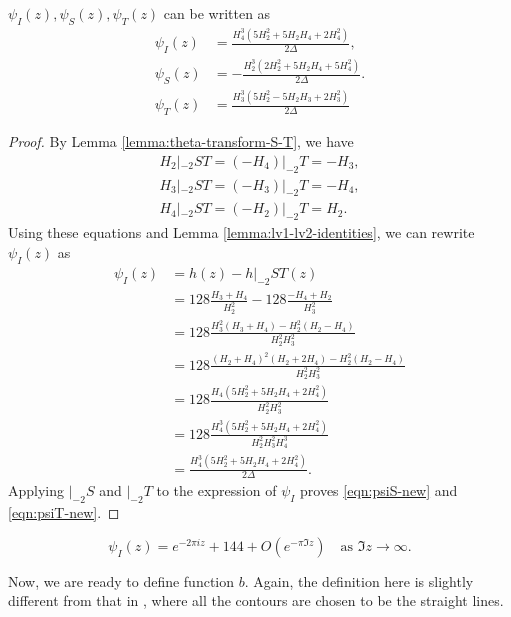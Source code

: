 \begin{lemma}\label{lemma:psi-new}\leanok
    $\psi_I(z), \psi_S(z), \psi_T(z)$ can be written as
    \begin{align}
        \psi_I(z) &= \frac{H_4^3 (5 H_2^2 + 5 H_2 H_4 + 2 H_4^2)}{2\Delta}, \label{eqn:psiI-new} \\
        \psi_S(z) &= -\frac{H_2^3 (2 H_2^2 + 5 H_2 H_4 + 5 H_4^2)}{2 \Delta}. \label{eqn:psiS-new} \\
        \psi_T(z) &= \frac{H_3^3 (5 H_2^2 - 5 H_2 H_3 + 2 H_3^2)}{2 \Delta}\label{eqn:psiT-new}
    \end{align}
\end{lemma}
\begin{proof}\leanok
By Lemma \ref{lemma:theta-transform-S-T}, we have
\begin{align}
    H_2|_{-2}ST = (-H_4)|_{-2}T = -H_3, \\
    H_3|_{-2}ST = (-H_3)|_{-2}T = -H_4, \\
    H_4|_{-2}ST = (-H_2)|_{-2}T = H_2.
\end{align}
Using these equations and Lemma \ref{lemma:lv1-lv2-identities}, we can rewrite $\psi_I(z)$ as
\begin{align}
    \psi_I(z) &= h(z) - h|_{-2}ST(z) \\
    &= 128 \frac{H_3 + H_4}{H_2^2} - 128 \frac{-H_4 + H_2}{H_3^2} \\
    &= 128 \frac{H_3^2 (H_3 + H_4) - H_2^2 (H_2 - H_4)}{H_2^2 H_3^2} \\
    &= 128 \frac{(H_2 + H_4)^2 (H_2 + 2 H_4) - H_2^2 (H_2 - H_4)}{H_2^2 H_3^2} \\
    &= 128 \frac{H_4(5 H_2^2 + 5 H_2 H_4 + 2 H_4^2)}{ H_2^2 H_3^2} \\
    &= 128 \frac{H_4^3(5 H_2^2 + 5 H_2 H_4 + 2 H_4^2)}{ H_2^2 H_3^2 H_4^3} \\
    &= \frac{H_4^3 (5 H_2^2 + 5 H_2 H_4 + 2 H_4^2)}{2\Delta}.
\end{align}
Applying $|_{-2}S$ and $|_{-2}T$ to the expression of $\psi_I$ proves \eqref{eqn:psiS-new} and \eqref{eqn:psiT-new}.
\end{proof}
\begin{equation}\label{eqn:psiI-fourier}
    \psi_I(z)=e^{-2\pi i z}+144+O(e^{-\pi \Im z}) \quad \text{as } \Im z\to\infty.
\end{equation}


Now, we are ready to define function $b$.
Again, the definition here is slightly different from that in \cite{Via2017}, where all the contours are chosen to be the straight lines.


